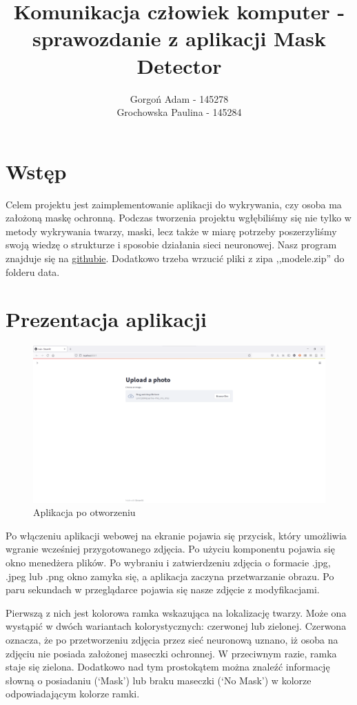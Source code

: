 \documentclass[12pt]{article}
\title{Komunikacja człowiek komputer - sprawozdanie z aplikacji Mask Detector}
\author{Gorgoń Adam - 145278\\Grochowska Paulina - 145284}
\begin{document}
	\maketitle
	
	\section{Wstęp}
	Celem projektu jest zaimplementowanie aplikacji do wykrywania, czy osoba ma założoną maskę ochronną. Podczas tworzenia projektu wgłębiliśmy się nie tylko w metody wykrywania twarzy, maski, lecz także w miarę potrzeby poszerzyliśmy swoją wiedzę o strukturze i sposobie działania sieci neuronowej. Nasz program znajduje się na \href{https://github.com/Ag0r9/mask-detector}{githubie}. Dodatkowo trzeba wrzucić pliki z zipa ,,modele.zip'' do folderu data.
	\section{Prezentacja aplikacji}
	\begin{figure}
		\centering
		\includegraphics[width=\textwidth]{apka.png}
		\caption{Aplikacja po otworzeniu}
		\label{fig:apka}
	\end{figure}
	Po włączeniu aplikacji webowej na ekranie pojawia się przycisk, który umożliwia wgranie wcześniej przygotowanego zdjęcia. Po użyciu komponentu pojawia się okno menedżera plików. Po wybraniu i zatwierdzeniu zdjęcia o formacie .jpg, .jpeg lub .png okno zamyka się, a aplikacja zaczyna przetwarzanie obrazu. Po paru sekundach w przeglądarce pojawia się nasze zdjęcie z modyfikacjami.
	
	Pierwszą z nich jest kolorowa ramka wskazująca na lokalizację twarzy. Może ona wystąpić w dwóch wariantach kolorystycznych: czerwonej lub zielonej. Czerwona oznacza, że po przetworzeniu zdjęcia przez sieć neuronową uznano, iż osoba na zdjęciu nie posiada założonej maseczki ochronnej. W przeciwnym razie, ramka staje się zielona. Dodatkowo nad tym prostokątem można znaleźć informację słowną o posiadaniu (‘Mask’) lub braku maseczki (‘No Mask’) w kolorze odpowiadającym kolorze ramki.
	
\end{document}
